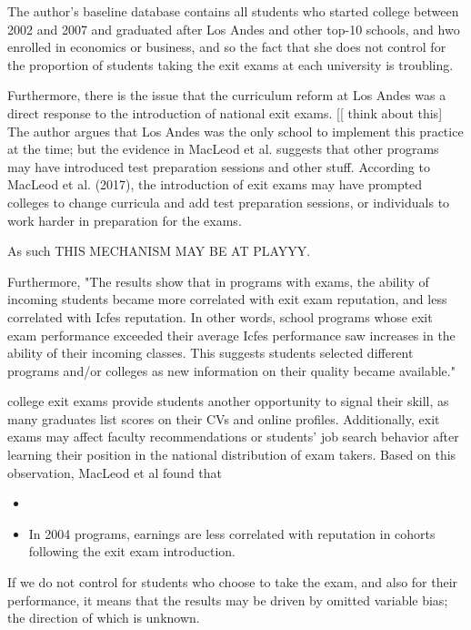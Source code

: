 \documentclass[a4paper, 11pt]{article}
\begin{document}
The author's baseline database contains all students who started college between 2002 and 2007 and graduated after Los Andes and other top-10 schools, and hwo enrolled in economics or business, and so the fact that she does not control for the proportion of students taking the exit exams at each university is troubling. 

Furthermore, there is the issue that the curriculum reform at Los Andes was a direct response to the introduction of national exit exams. [[ think about this]  The author argues that Los Andes was the only school to implement this practice at the time; but the evidence in MacLeod et al. suggests that other programs may have introduced test preparation sessions and other stuff.  According to MacLeod et al. (2017), the introduction of exit exams may have prompted colleges to change curricula and add test preparation sessions, or individuals to work harder in preparation for the exams.



As such THIS MECHANISM MAY BE AT PLAYYY. 

Furthermore, "The results show that in programs with exams, the ability of incoming students
became more correlated with exit exam reputation, and less correlated with Icfes
reputation. In other words, school programs whose exit exam performance exceeded
their average Icfes performance saw increases in the ability of their incoming classes.
This suggests students selected different programs and/or colleges as new information
on their quality became available."


college exit exams provide students another opportunity to signal their skill, as many graduates list scores on their CVs and online profiles.  Additionally, exit exams may affect faculty recommendations or students' job search behavior after learning their position in the national distribution of exam takers.  Based on this observation, MacLeod et al found that 
\begin{itemize}
\item
\item In 2004 programs, earnings are less correlated with reputation in cohorts following the exit exam introduction.  
\end{itemize}

If we do not control for students who choose to take the exam, and also for their performance, it means that the results may be driven by omitted variable bias; the direction of which is unknown.  
\end{document}
